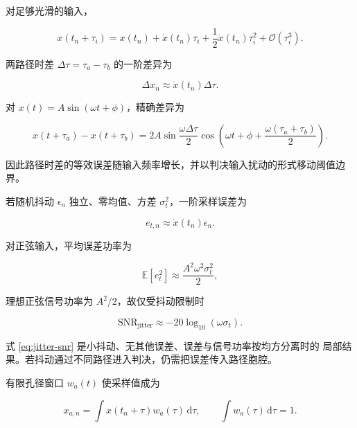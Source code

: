 \documentclass[11pt,a4paper]{ctexart}
\newcommand{\E}{\mathbb{E}}
\newcommand{\dd}{\,\mathrm{d}}
\theoremstyle{adcplain}
\theoremstyle{definition}
\begin{document}
对足够光滑的输入，

\begin{equation}
  x(t_n+\tau_i)
  =
  x(t_n)+\dot x(t_n)\tau_i
  +\frac{1}{2}\ddot x(t_n)\tau_i^2+\mathcal O(\tau_i^3).
  \label{eq:timing-taylor}
\end{equation}

两路径时差 $\Delta\tau=\tau_a-\tau_b$ 的一阶差异为

\begin{equation}
  \Delta x_n\approx\dot x(t_n)\Delta\tau.
  \label{eq:path-skew}
\end{equation}

对 $x(t)=A\sin(\omega t+\phi)$，精确差异为

\begin{equation}
  x(t+\tau_a)-x(t+\tau_b)
  =
  2A\sin\frac{\omega\Delta\tau}{2}
  \cos\left(\omega t+\phi+\frac{\omega(\tau_a+\tau_b)}{2}\right).
  \label{eq:sine-skew-exact}
\end{equation}

因此路径时差的等效误差随输入频率增长，并以判决输入扰动的形式移动阈值边界。

若随机抖动 $\epsilon_n$ 独立、零均值、方差 $\sigma_t^2$，一阶采样误差为

\begin{equation}
  e_{t,n}\approx\dot x(t_n)\epsilon_n.
\end{equation}

对正弦输入，平均误差功率为

\begin{equation}
  \E[e_t^2]
  \approx
  \frac{A^2\omega^2\sigma_t^2}{2},
\end{equation}

理想正弦信号功率为 $A^2/2$，故仅受抖动限制时

\begin{equation}
  \mathrm{SNR}_{\mathrm{jitter}}
  \approx
  -20\log_{10}(\omega\sigma_t).
  \label{eq:jitter-snr}
\end{equation}

式 \eqref{eq:jitter-snr} 是小抖动、无其他误差、误差与信号功率按均方分离时的
局部结果。若抖动通过不同路径进入判决，仍需把误差传入路径胞腔。

有限孔径窗口 $w_a(t)$ 使采样值成为

\begin{equation}
  x_{a,n}
  =
  \int x(t_n+\tau)w_a(\tau)\dd\tau,
  \qquad
  \int w_a(\tau)\dd\tau=1.
  \label{eq:aperture}
\end{equation}
\end{document}
